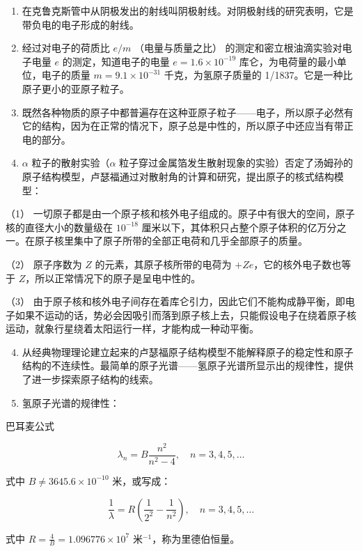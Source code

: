 \begin{enumerate}
\item
  在克鲁克斯管中从阴极发出的射线叫阴极射线。对阴极射线的研究表明，它是带负电的电子形成的射线。
\item
  经过对电子的荷质比 \(e / m\) （电量与质量之比）
  的测定和密立根油滴实验对电子电量 \(e\) 的测定，知道电子的电量
  \(e=1.6\times10^{-19}\) 库仑，为电荷量的最小单位，电子的质量
  \(m=9.1\times10^{-31}\) 千克，为氢原子质量的
  1/1837。它是一种比原子更小的亚原子粒子。
\item
  既然各种物质的原子中都普遍存在这种亚原子粒子------电子，所以原子必然有它的结构，因为在正常的情况下，原子总是中性的，所以原子中还应当有带正电的部分。
\item
  \(\alpha\) 粒子的散射实验（\(\alpha\)
  粒子穿过金属箔发生散射现象的实验）否定了汤姆孙的原子结构模型，卢瑟福通过对散射角的计算和研究，提出原子的核式结构模型：
\end{enumerate}

（1）
一切原子都是由一个原子核和核外电子组成的。原子中有很大的空间，原子核的直径大小的数量级在
\(10^{-18}\)
厘米以下，其体积只占整个原子体积的亿万分之一。在原子核里集中了原子所带的全部正电荷和几乎全部原子的质量。

（2） 原子序数为 \(Z\) 的元素，其原子核所带的电荷为
\(+Ze\)，它的核外电子数也等于 \(Z\)，所以正常情况下的原子是呈电中性的。

（3）
由于原子核和核外电子间存在着库仑引力，因此它们不能构成静平衡，即电子如果不运动的话，势必会因吸引而落到原子核上去，只能假设电子在绕着原子核运动，就象行星绕着太阳运行一样，才能构成一种动平衡。

\begin{enumerate}
\setcounter{enumi}{3}
\item
  从经典物理理论建立起来的卢瑟福原子结构模型不能解释原子的稳定性和原子结构的不连续性。最简单的原子光谱------氢原子光谱所显示出的规律性，提供了进一步探索原子结构的线索。
\item
  氢原子光谱的规律性：
\end{enumerate}

巴耳麦公式

\[
\lambda_ {n} = B \frac {n ^ {2}}{n ^ {2} - 4}, \quad n = 3, 4, 5, \dots
\]

式中 \(B \neq 3645.6 \times 10^{-10}\) 米，或写成：

\[
\frac {1}{\lambda} = R \left(\frac {1}{2 ^ {2}} - \frac {1}{n ^ {2}}\right), \quad n = 3, 4, 5, \dots
\]

式中 \(R = \frac{4}{B} = 1.096776 \times 10^{7}\)
米\(^{-1}\)，称为里德伯恒量。

